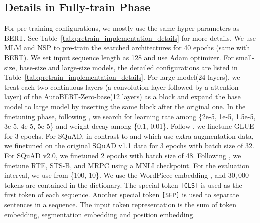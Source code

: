 \documentclass[letterpaper]{article} \usepackage{aaai22}  \usepackage{times}  \usepackage{helvet}  \usepackage{courier}  \usepackage[hyphens]{url}  \usepackage{graphicx} \urlstyle{rm} \def\UrlFont{\rm}  \usepackage{natbib}  \usepackage{caption} \DeclareCaptionStyle{ruled}{labelfont=normalfont,labelsep=colon,strut=off} \frenchspacing  \setlength{\pdfpagewidth}{8.5in}  \setlength{\pdfpageheight}{11in}  \usepackage{algorithm}
\begin{document}
\subsection{Details in Fully-train Phase}
For pre-training configurations, we mostly use the same hyper-parameters as BERT. See Table~\ref{tab:pretrain_implementation_details} for more details. We use MLM and NSP to pre-train the searched architectures for 40 epochs (same with BERT). We set input sequence length as 128 and use Adam\citep{DBLP:adam} optimizer. For small-size, base-size and large-size models, the detailed configurations are listed in Table~\ref{tab:pretrain_implementation_details}. For large model(24 layers), we treat each two continuous layers (a convolution layer followed by a attention layer)  of the AutoBERT-Zero-base(12 layers) as a block and expand the base model to large model by inserting the same block after the original one.
In the finetuning phase, following \citep{devlin2019bert, jiang2020convbert}, we search for learning rate among \{2e-5, 1e-5, 1.5e-5, 3e-5, 4e-5, 5e-5\} and weight decay among \{0.1, 0.01\}. Follow \cite{devlin2019bert,jiang2020convbert}, we finetune GLUE for 3 epochs. For SQuAD, in contrast to \cite{lan2019albert} and \cite{devlin2019bert} which use extra augmentation data, we finetuned on the original SQuAD v1.1 data for 3 epochs with batch size of 32. For SQuAD v2.0, we finetuned 2 epochs with batch size of 48. Following \citep{liu2019roberta}, we finetune RTE, STS-B, and MRPC using a MNLI checkpoint. For the evaluation interval, we use from \{100, 10\}.  We use the WordPiece embedding \citep{wu2016google}, and $30,000$ tokens are
contained in the dictionary. The special token {\tt [CLS]} is used as the first
token of each sequence. Another special token {\tt [SEP]} is used to separate
sentences in a sequence. The input token representation is the sum of token embedding, segmentation embedding and position embedding.


\begin{table}[h]
\begin{center}
\centering{}
\caption{{More comparison about model latency and memory. GLUE is reported on dev set. }}\label{tab:latency}
\end{center}
\end{table}
\end{document}
